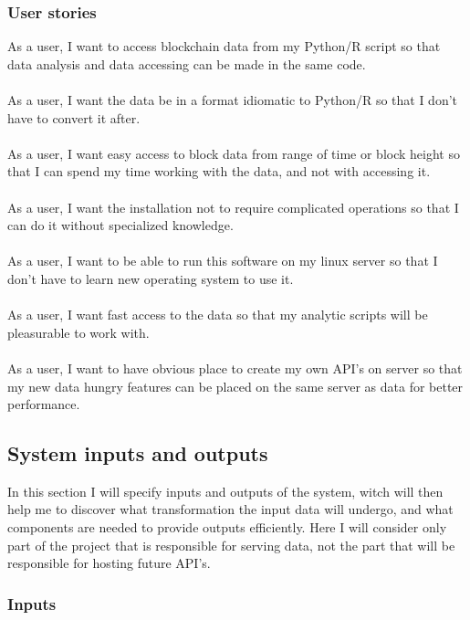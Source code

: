 \documentclass[12pt, en, eng]{mgr}
\begin{document}
\subsubsection{User stories}
As a user, I want to access blockchain data from my Python/R script so that data analysis and data accessing can be made in the same code.
\\
\\
As a user, I want the data be in a format idiomatic to Python/R so that I don't have to convert it after.
\\
\\
As a user, I want easy access to block data from range of time or block height so that I can spend my time working with the data, and not with accessing it.
\\
\\
As a user, I want the installation not to require complicated operations so that I can do it without specialized knowledge.
\\
\\
As a user, I want to be able to run this software on my linux server so that I don't have to learn new operating system to use it.
\\
\\
As a user, I want fast access to the data so that my analytic scripts will be pleasurable to work with.
\\
\\
As a user, I want to have obvious place to create my own API's on server so that my new data hungry features can be placed on the same server as data for better performance.


\subsection{System inputs and outputs}

In this section I will specify inputs and outputs of the system, witch will then help me to discover what transformation the input data will undergo, and what components are needed to provide outputs efficiently. Here I will consider only part of the project that is responsible for serving data, not the part that will be responsible for hosting future API's.

\subsubsection{Inputs}
\end{document}
